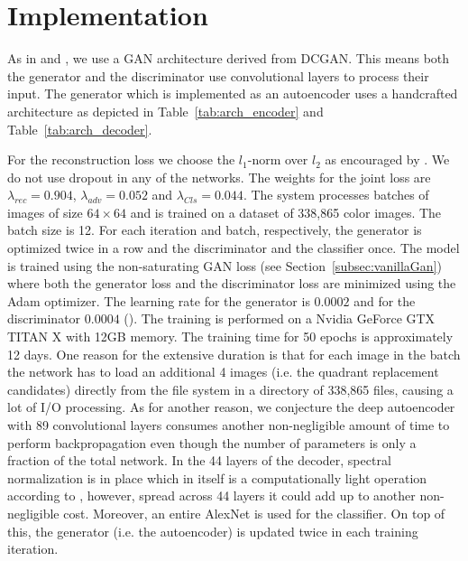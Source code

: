 \documentclass[a4paper,12pt]{report}
\begin{document}
\section{Implementation}\label{subsec:implementation}
As in \cite{DisentFacOfVarByMixTh} and \cite{InfoGAN}, we use a GAN architecture derived from DCGAN. This means both the generator and the discriminator use convolutional layers to process their input. The generator which is implemented as an autoencoder uses a handcrafted architecture as depicted in Table~\ref{tab:arch_encoder} and Table~\ref{tab:arch_decoder}.


For the reconstruction loss we choose the $l_1$-norm over $l_2$ as encouraged by \cite{CondGAN_PatchGAN}. We do not use dropout in any of the networks. The weights for the joint loss are $ \lambda_{rec} = 0.904$, $\lambda_{adv} = 0.052$ and $ \lambda_{Cls} = 0.044$. The system processes batches of images of size $64 \times 64$ and is trained on a dataset of 338,865 color images. The batch size is 12. For each iteration and batch, respectively, the generator is optimized twice in a row and the discriminator and the classifier once. The model is trained using the non-saturating GAN loss (see Section~\ref{subsec:vanillaGan}) where both the generator loss and the discriminator loss are minimized using the Adam optimizer. The learning rate for the generator is $0.0002$ and for the discriminator $0.0004$ (\cite{TTUR}). The training is performed on a Nvidia GeForce GTX TITAN X with 12GB memory. The training time for 50 epochs is approximately 12 days. One reason for the extensive duration is that for each image in the batch the network has to load an additional 4 images (i.e. the quadrant replacement candidates) directly from the file system in a directory of 338,865 files, causing a lot of I/O processing. As for another reason, we conjecture the deep autoencoder with 89 convolutional layers consumes another non-negligible amount of time to perform backpropagation even though the number of parameters is only a fraction of the total network. In the 44 layers of the decoder, spectral normalization is in place which in itself is a computationally light operation according to \cite{SNGAN}, however, spread across 44 layers it could add up to another non-negligible cost. Moreover, an entire AlexNet is used for the classifier. On top of this, the generator (i.e. the autoencoder) is updated twice in each training iteration.
\end{document}
